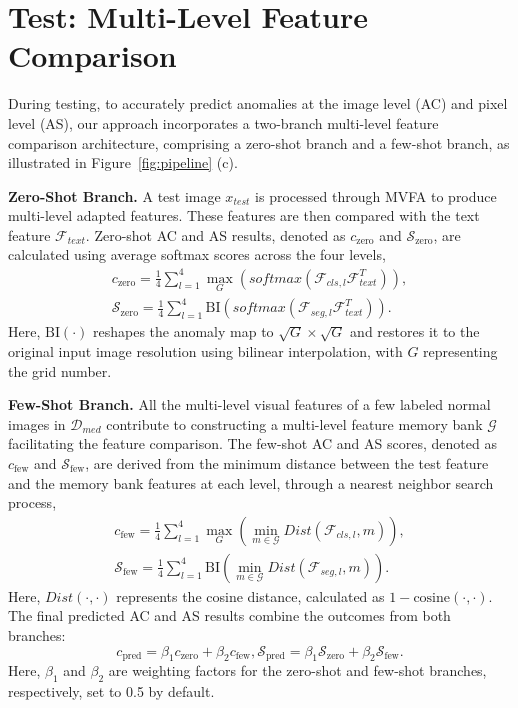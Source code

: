 \section{Test: Multi-Level Feature Comparison}
\label{sec:test}
During testing, to accurately predict anomalies at the image level (AC) and pixel level (AS), our approach incorporates a two-branch multi-level feature comparison architecture, comprising a zero-shot branch and a few-shot branch, as illustrated in Figure~\ref{fig:pipeline} (c).

\noindent\textbf{Zero-Shot Branch.} 
A test image $x_{test}$ is processed through MVFA to produce multi-level adapted features. These features are then compared with the text feature $\mathcal{F}_{text}$. Zero-shot AC and AS results, denoted as $c_{\text{zero}}$ and $\mathcal{S}_{\text{zero}}$, are calculated using average softmax scores across the four levels, 
\begin{equation}
\begin{aligned}
c_{\text{zero}} = \frac{1}{4}{\textstyle \sum_{l=1}^4}\max_{G}(\textit{softmax}(\mathcal{F}_{cls,l} \mathcal{F}_{text}^{T})),\\ \mathcal{S}_{\text{zero}} = \frac{1}{4}{\textstyle \sum_{l=1}^4}\text{BI}(\textit{softmax}(\mathcal{F}_{seg,l} \mathcal{F}_{text}^{T})).
\end{aligned}
\end{equation}
Here, $\text{BI}(\cdot)$ reshapes the anomaly map to $\sqrt{G}\times\sqrt{G}$ and restores it to the original input image resolution using bilinear interpolation, with $G$ representing the grid number.

\noindent\textbf{Few-Shot Branch.} 
All the multi-level visual features of a few labeled normal images in $\mathcal{D}_{med}$ contribute to constructing a multi-level feature memory bank $\mathcal{G}$ facilitating the feature comparison. The few-shot AC and AS scores, denoted as $c_{\text{few}}$ and $\mathcal{S}_{\text{few}}$, are derived from the minimum distance between the test feature and the memory bank features at each level, through a nearest neighbor search process, 
\begin{equation}
\begin{aligned}
    c_{\text{few}} = \frac{1}{4}{\textstyle \sum_{l=1}^4}\max_G(\min_{m\in\mathcal{G}}\textit{Dist}(\mathcal{F}_{cls,l},m)), \\ \mathcal{S}_{\text{few}} = \frac{1}{4}{\textstyle \sum_{l=1}^4}\text{BI}(\min_{m\in\mathcal{G}}\textit{Dist}(\mathcal{F}_{seg,l},m)).     
\end{aligned}
\end{equation}
Here, $\textit{Dist}(\cdot, \cdot)$ represents the cosine distance, calculated as $1-\text{cosine}(\cdot,\cdot)$. The final predicted AC and AS results combine the outcomes from both branches:
\begin{equation}
    c_{\text{pred}} = \beta_1 c_{\text{zero}}+ \beta_2 c_{\text{few}}, \mathcal{S}_{\text{pred}} = \beta_1 \mathcal{S}_{\text{zero}}+ \beta_2 \mathcal{S}_{\text{few}}.
\end{equation} 
Here, $\beta_1$ and $\beta_2$ are weighting factors for the zero-shot and few-shot branches, respectively, set to 0.5 by default. 